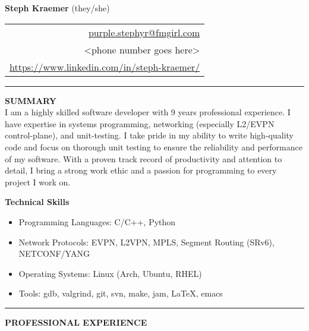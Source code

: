 \documentclass{letter}
\begin{document}
{\Huge\bf Steph Kraemer} (they/she) \hfill
\begin{tabular}{r}
  \href{mailto:purple.stephyr@fmgirl.com}{purple.stephyr@fmgirl.com} \\
  <phone number goes here> \\
  \href{https://www.linkedin.com/in/steph-kraemer/}{https://www.linkedin.com/in/steph-kraemer/}
\end{tabular}

\vskip 2pt
\hrule

{\large\bf SUMMARY} \\
I am a highly skilled software developer with 9 years professional experience. I have expertise in systems programming, networking (especially L2/EVPN control-plane), and unit-testing. I take pride in my ability to write high-quality code and focus on thorough unit testing to ensure the reliability and performance of my software. With a proven track record of productivity and attention to detail, I bring a strong work ethic and a passion for programming to every project I work on.
\vskip 2pt

{\bf Technical Skills}

\begin{itemize}
  \item Programming Languages: C/C++, Python
  \item Network Protocols: EVPN, L2VPN, MPLS, Segment Routing (SRv6), NETCONF/YANG
  \item Operating Systems: Linux (Arch, Ubuntu, RHEL)
  \item Tools: gdb, valgrind, git, svn, make, jam, LaTeX, emacs
\end{itemize}

\vskip 2pt
\hrule
{\large\bf PROFESSIONAL EXPERIENCE}
\end{document}
